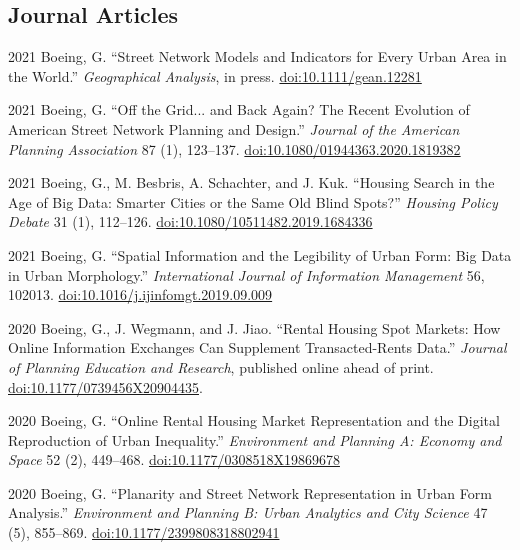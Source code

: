 \documentclass[12pt,letterpaper]{report}
\begin{document}
    \subsection*{Journal Articles}

    \begin{tablist}

        \item[2021] \tab Boeing, G. \enquote{Street Network Models and Indicators for Every Urban Area in the World.} \textit{Geographical Analysis}, in press. \href{https://doi.org/10.1111/gean.12281}{doi:10.1111/gean.12281}

        \item[2021] \tab Boeing, G. \enquote{Off the Grid... and Back Again? The Recent Evolution of American Street Network Planning and Design.} \textit{Journal of the American Planning Association} 87 (1), 123--137. \href{https://doi.org/10.1080/01944363.2020.1819382}{doi:10.1080/01944363.2020.1819382}

        \item[2021] \tab Boeing, G., M. Besbris, A. Schachter, and J. Kuk. \enquote{Housing Search in the Age of Big Data: Smarter Cities or the Same Old Blind Spots?} \textit{Housing Policy Debate} 31 (1), 112--126. \href{https://doi.org/10.1080/10511482.2019.1684336}{doi:10.1080/10511482.2019.1684336}

        \item[2021] \tab Boeing, G. \enquote{Spatial Information and the Legibility of Urban Form: Big Data in Urban Morphology.} \textit{International Journal of Information Management} 56, 102013. \href{https://doi.org/10.1016/j.ijinfomgt.2019.09.009}{doi:10.1016/j.ijinfomgt.2019.09.009}

        \item[2020] \tab Boeing, G., J. Wegmann, and J. Jiao. \enquote{Rental Housing Spot Markets: How Online Information Exchanges Can Supplement Transacted-Rents Data.} \textit{Journal of Planning Education and Research}, published online ahead of print. \href{https://doi.org/10.1177/0739456X20904435}{doi:10.1177/0739456X20904435}.

        \item[2020] \tab Boeing, G. \enquote{Online Rental Housing Market Representation and the Digital Reproduction of Urban Inequality.} \textit{Environment and Planning A: Economy and Space} 52 (2), 449--468. \href{https://doi.org/10.1177/0308518X19869678}{doi:10.1177/0308518X19869678}

        \item[2020] \tab Boeing, G. \enquote{Planarity and Street Network Representation in Urban Form Analysis.} \textit{Environment and Planning B: Urban Analytics and City Science} 47 (5), 855--869. \href{https://doi.org/10.1177/2399808318802941}{doi:10.1177/2399808318802941}


\end{tablist}
\end{document}
